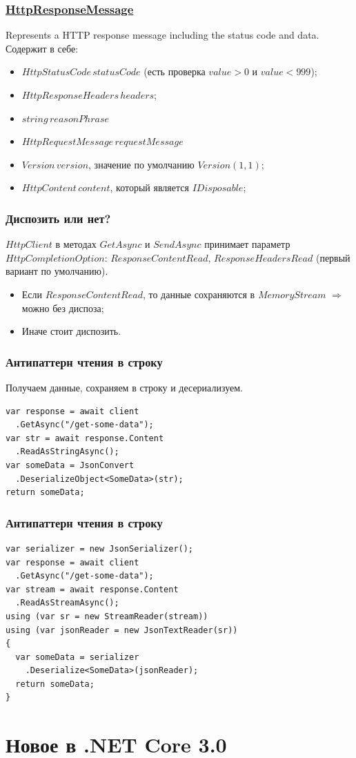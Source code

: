 \documentclass{beamer}
\begin{document}
\begin{frame}
\frametitle{\href{https://docs.microsoft.com/en-us/dotnet/api/system.net.http.httpresponsemessage?view=netcore-2.2}{HttpResponseMessage}}
Represents a HTTP response message including the status code and data.
\newline
\newline
Содержит в себе:
\begin{itemize}
	\item $HttpStatusCode\,statusCode$ (есть проверка $value > 0$ и $value < 999$);
	\item $HttpResponseHeaders\,headers$;
	\item $string\,reasonPhrase$
	\item $HttpRequestMessage\,requestMessage$
	\item $Version\,version$, значение по умолчанию $Version(1, 1)$;
	\item $HttpContent\,content$, который является $IDisposable$;
\end{itemize}
\end{frame}

\begin{frame}
\frametitle{Диспозить или нет?}
$HttpClient$ в методах $GetAsync$ и $SendAsync$ принимает параметр  $HttpCompletionOption$: $ResponseContentRead$, $ResponseHeadersRead$ (первый вариант по умолчанию).
\newline
\begin{itemize}
	\item Если $ResponseContentRead$, то данные сохраняются в $MemoryStream$ $\Rightarrow$ можно без диспоза;
	\item Иначе стоит диспозить. 
\end{itemize}
\end{frame}

\begin{frame}[fragile]
\frametitle{Антипаттерн чтения в строку}
Получаем данные, сохраняем в строку и десериализуем.
\newline
\begin{lstlisting}
var response = await client
  .GetAsync("/get-some-data");
var str = await response.Content
  .ReadAsStringAsync();
var someData = JsonConvert
  .DeserializeObject<SomeData>(str);
return someData;
\end{lstlisting}
\end{frame}

\begin{frame}[fragile]
\frametitle{Антипаттерн чтения в строку}
\begin{lstlisting}
var serializer = new JsonSerializer();
var response = await client
  .GetAsync("/get-some-data");
var stream = await response.Content
  .ReadAsStreamAsync();
using (var sr = new StreamReader(stream))
using (var jsonReader = new JsonTextReader(sr))
{
  var someData = serializer
    .Deserialize<SomeData>(jsonReader);
  return someData;
}
\end{lstlisting}
\end{frame}

\section{Новое в .NET Core 3.0}
\begin{frame}
\end{frame}
\end{document}
